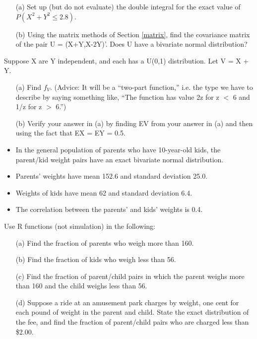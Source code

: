 \begin{itemize}

\item [(a)] Set up (but do not evaluate) the double integral for the
exact value of $P(X^2+Y^2 \leq 2.8)$.

\item [(b)] Using the matrix methods of Section \ref{matrix}, find the
covariance matrix of the pair U = (X+Y,X-2Y)'.  Does U have a bivariate
normal distribution?

\end{itemize}

\oneproblem
Suppose X are Y independent, and each has a U(0,1) distribution. Let V =
X + Y.

\begin{itemize}

\item [(a)] Find $f_V$. (Advice: It will be a ``two-part function,''
i.e. the type we have to describe by saying something like, ``The
function has value 2z for z $<$ 6 and 1/z for z $>$ 6.'') 

\item [(b)] Verify your answer in (a) by finding EV from your answer in
(a) and then using the fact that EX = EY = 0.5.

\end{itemize}

\begin{itemize}

\item  In the general population of parents who have 10-year-old kids,
the parent/kid weight pairs have an exact bivariate normal distribution.

\item Parents' weights have mean 152.6 and standard deviation 25.0.

\item Weights of kids have mean 62 and standard deviation 6.4.

\item The correlation between the parents' and kids' weights is 0.4.

\end{itemize}

Use R functions (not simulation) in the following:

\begin{itemize}

\item [(a)] Find the fraction of parents who weigh more than 160.

\item [(b)] Find the fraction of kids who weigh less than 56.

\item [(c)] Find the fraction of parent/child pairs in which the parent
weighs more than 160 and the child weighs less than 56.

\item [(d)] Suppose a ride at an amusement park charges by weight, one
cent for each pound of weight in the parent and child. State the exact
distribution of the fee, and find the fraction of parent/child pairs who
are charged less than \$2.00.

\end{itemize}

